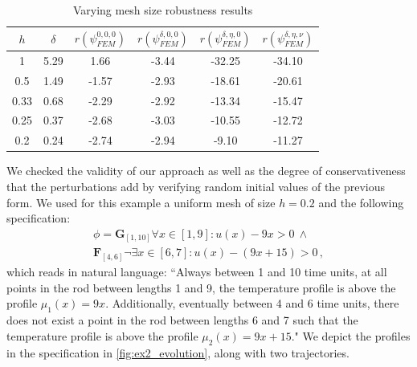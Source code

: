 \documentclass[letterpaper, 10 pt, conference]{ieeeconf/ieeeconf}
\newcommand{\Always}{\mathbf{G}}
\newcommand{\Event}{\mathbf{F}}
\begin{document}
\begin{table}
\centering
\caption{Varying mesh size robustness results}
\label{tab:res_meshes}
\begin{tabular}{|c|c|c|c|c|c|}
    \hline
    $h$ & $\delta$ & $r(\psi_{FEM}^{0, 0, 0})$ & $r(\psi_{FEM}^{\delta, 0, 0})$ &
    $r(\psi_{FEM}^{\delta, \eta, 0})$ & $r(\psi_{FEM}^{\delta, \eta,
\nu})$ \\
    \hline
    1 & 5.29 & 1.66 & -3.44 & -32.25 & -34.10 \\
    0.5 & 1.49 & -1.57 & -2.93 & -18.61 & -20.61 \\
    0.33 & 0.68 & -2.29 & -2.92 & -13.34 & -15.47 \\
    0.25 & 0.37 & -2.68 & -3.03 & -10.55 & -12.72 \\
    0.2 & 0.24 & -2.74 & -2.94 & -9.10 & -11.27 \\
    \hline
\end{tabular}
\end{table}

We checked the validity of our approach as well as the degree of
conservativeness that the perturbations add by verifying random initial values
of the previous form. We used for this example a uniform mesh of size $h = 0.2$
and the following specification: 
%
\begin{multline}
        \phi = \Always_{[1, 10]} \forall x \in [1, 9]: u(x) - 9x > 0 \ \land \\
        \Event_{[4, 6]} \lnot \exists x \in [6, 7]: u(x) - (9x + 15) > 0 \,,
\end{multline}
%
which reads in natural language: ``Always between 1 and 10 time units, at all
points in the rod between lengths 1 and 9, the temperature profile is above the
profile $\mu_1(x) = 9x$. Additionally, eventually between 4 and 6 time units,
there does not exist a point in the rod between lengths 6 and 7 such that the
temperature profile is above the profile $\mu_2(x) = 9x + 15$." We depict the
profiles in the specification in \cref{fig:ex2_evolution}, along with two
trajectories.
\end{document}
